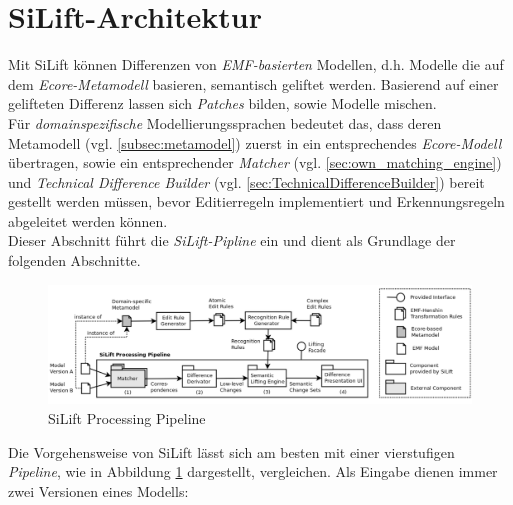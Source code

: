 \section{SiLift-Architektur}\label{silift_architecture}
Mit SiLift können Differenzen von \textit{EMF-basierten} Modellen, d.h. Modelle die auf dem \textit{Ecore-Metamodell} basieren, semantisch geliftet werden. Basierend auf einer gelifteten Differenz lassen sich \textit{Patches} bilden, sowie Modelle mischen.\\
Für \textit{domainspezifische} Modellierungssprachen bedeutet das, dass deren Metamodell (vgl. \ref{subsec:metamodel}) zuerst in ein entsprechendes \textit{Ecore-Modell} übertragen, sowie ein entsprechender \textit{Matcher} (vgl. \ref{sec:own_matching_engine}) und \textit{Technical Difference Builder} (vgl. \ref{sec:TechnicalDifferenceBuilder}) bereit gestellt werden müssen, bevor Editierregeln implementiert und Erkennungsregeln abgeleitet werden können.\\
Dieser Abschnitt führt die \textit{SiLift-Pipline} ein und dient als Grundlage der folgenden Abschnitte.


\begin{figure}[H]
\centering
\includegraphics[width=\textwidth]{architecture/graphics/silift-processing_pipeline.png}
\caption{SiLift Processing Pipeline}
\label{silift-processing_pipeline}
\end{figure}

Die Vorgehensweise von SiLift lässt sich am besten mit einer vierstufigen \textit{Pipeline}, wie in Abbildung \ref{silift-processing_pipeline} dargestellt,  vergleichen.
Als Eingabe dienen immer zwei Versionen eines Modells:

